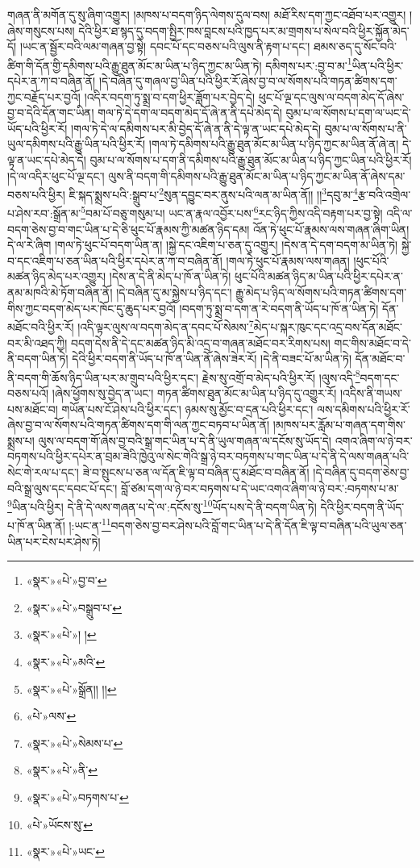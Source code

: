 གཞན་ནི་མགོན་དུ་སུ་ཞིག་འགྱུར། །མཁས་པ་བདག་ཉིད་ལེགས་དུལ་བས། མཐོ་རིས་དག་ཀྱང་འཐོབ་པར་འགྱུར། །ཞེས་གསུངས་པས། དེའི་ཕྱིར་ཐ་སྙད་དུ་བདག་སྤྱིར་ཁས་བླངས་པའི་ཁྱད་པར་མ་གྲགས་པ་སེལ་བའི་ཕྱིར་སྐྱོན་མེད་དོ། །ཡང་ན་སྦྱོར་བའི་ལམ་གཞན་བྱ་སྟེ། དབང་པོ་དང་བཅས་པའི་ལུས་ནི་རྟག་པ་དང་། ཐམས་ཅད་དུ་སོང་བའི་ཚིག་གི་དོན་གྱི་དམིགས་པའི་རྒྱུ་ཐུན་མོང་མ་ཡིན་པ་ཉིད་ཀྱང་མ་ཡིན་ཏེ། དམིགས་པར་:བྱ་བ་མ་\footnote{«སྣར་»«པེ་»བྱ་བ་}ཡིན་པའི་ཕྱིར་དཔེར་ན་ཀ་བ་བཞིན་ནོ། །དེ་བཞིན་དུ་གཞལ་བྱ་ཡིན་པའི་ཕྱིར་རོ་ཞེས་བྱ་བ་ལ་སོགས་པའི་གཏན་ཚིགས་དག་ཀྱང་བརྗོད་པར་བྱའོ། །འདིར་བདག་ཏུ་སྨྲ་བ་དག་ཕྱིར་ཟློག་པར་བྱེད་དེ། ཕུང་པོ་ལྔ་དང་ལུས་ལ་བདག་མེད་དོ་ཞེས་བྱ་བ་དེའི་དོན་གང་ཡིན། གལ་ཏེ་དེ་དག་ལ་བདག་མེད་དོ་ཞེ་ན་ནི་དཔེ་མེད་དེ། བུམ་པ་ལ་སོགས་པ་དག་ལ་ཡང་དེ་ཡོད་པའི་ཕྱིར་རོ། །གལ་ཏེ་དེ་ལ་དམིགས་པར་མི་བྱེད་དོ་ཞེ་ན་ནི་དེ་ལྟ་ན་ཡང་དཔེ་མེད་དེ། བུམ་པ་ལ་སོགས་པ་ནི་ཡུལ་དམིགས་པའི་རྒྱུ་ཡིན་པའི་ཕྱིར་རོ། །གལ་ཏེ་དམིགས་པའི་རྒྱུ་ཐུན་མོང་མ་ཡིན་པ་ཉིད་ཀྱང་མ་ཡིན་ནོ་ཞེ་ན། དེ་ལྟ་ན་ཡང་དཔེ་མེད་དེ། བུམ་པ་ལ་སོགས་པ་དག་ནི་དམིགས་པའི་རྒྱུ་ཐུན་མོང་མ་ཡིན་པ་ཉིད་ཀྱང་ཡིན་པའི་ཕྱིར་རོ། །དེ་ལ་འདིར་ཕུང་པོ་ལྔ་དང་། ལུས་ནི་བདག་གི་དམིགས་པའི་རྒྱུ་ཐུན་མོང་མ་ཡིན་པ་ཉིད་ཀྱང་མ་ཡིན་ནོ་ཞེས་དམ་བཅས་པའི་ཕྱིར། ཇི་སྐད་སྨྲས་པའི་:སྒྲུབ་པ་\footnote{«སྣར་»«པེ་»བསྒྲུབ་པ་}སུན་དབྱུང་བར་ནུས་པའི་ལན་མ་ཡིན་ནོ།། །།\footnote{«སྣར་»«པེ་»། །}དབུ་མ་\footnote{«སྣར་»«པེ་»མའི་}རྩ་བའི་འགྲེལ་པ་ཤེས་རབ་:སྒྲོན་མ་\footnote{«སྣར་»«པེ་»སྒྲོན།། །།}བམ་པོ་བཅུ་གསུམ་པ། ཡང་ན་རྣལ་འབྱོར་པས་\footnote{«པེ་»ལས་}རང་ཉིད་ཀྱིས་འདི་བརྟག་པར་བྱ་སྟེ། འདི་ལ་བདག་ཅེས་བྱ་བ་གང་ཡིན་པ་དེ་ཅི་ཕུང་པོ་རྣམས་ཀྱི་མཚན་ཉིད་དམ། འོན་ཏེ་ཕུང་པོ་རྣམས་ལས་གཞན་ཞིག་ཡིན། དེ་ལ་རེ་ཞིག །གལ་ཏེ་ཕུང་པོ་བདག་ཡིན་ན། །སྐྱེ་དང་འཇིག་པ་ཅན་དུ་འགྱུར། །དེས་ན་དེ་དག་བདག་མ་ཡིན་ཏེ། སྐྱེ་བ་དང་འཇིག་པ་ཅན་ཡིན་པའི་ཕྱིར་དཔེར་ན་ཀ་བ་བཞིན་ནོ། །གལ་ཏེ་ཕུང་པོ་རྣམས་ལས་གཞན། །ཕུང་པོའི་མཚན་ཉིད་མེད་པར་འགྱུར། །དེས་ན་དེ་ནི་མེད་པ་ཁོ་ན་ཡིན་ཏེ། ཕུང་པོའི་མཚན་ཉིད་མ་ཡིན་པའི་ཕྱིར་དཔེར་ན་ནམ་མཁའི་མེ་ཏོག་བཞིན་ནོ། །དེ་བཞིན་དུ་མ་སྐྱེས་པ་ཉིད་དང་། རྒྱུ་མེད་པ་ཉིད་ལ་སོགས་པའི་གཏན་ཚིགས་དག་གིས་ཀྱང་བདག་མེད་པར་ཁོང་དུ་ཆུད་པར་བྱའོ། །བདག་ཏུ་སྨྲ་བ་དག་ན་རེ་བདག་ནི་ཡོད་པ་ཁོ་ན་ཡིན་ཏེ། དོན་མཐོང་བའི་ཕྱིར་རོ། །འདི་ལྟར་ལུས་ལ་བདག་མེད་ན་དབང་པོ་སེམས་\footnote{«སྣར་»«པེ་»སེམས་པ་}མེད་པ་སྐར་ཁུང་དང་འདྲ་བས་དོན་མཐོང་བར་མི་འཐད་ཀྱི། བདག་དེས་ནི་དེ་དང་མཚན་ཉིད་མི་འདྲ་བ་གཞན་མཐོང་བར་རིགས་པས། གང་གིས་མཐོང་བ་དེ་ནི་བདག་ཡིན་ཏེ། དེའི་ཕྱིར་བདག་ནི་ཡོད་པ་ཁོ་ན་ཡིན་ནོ་ཞེས་ཟེར་རོ། །དེ་ནི་བཟང་པོ་མ་ཡིན་ཏེ། དོན་མཐོང་བ་ནི་བདག་གི་ཆོས་ཉིད་ཡིན་པར་མ་གྲུབ་པའི་ཕྱིར་དང་། རྗེས་སུ་འགྲོ་བ་མེད་པའི་ཕྱིར་རོ། །ལུས་འདི་\footnote{«སྣར་»«པེ་»ནི་}བདག་དང་བཅས་པའོ། །ཞེས་ཕྱོགས་སུ་བྱེད་ན་ཡང་། གཏན་ཚིགས་ཐུན་མོང་མ་ཡིན་པ་ཉིད་དུ་འགྱུར་རོ། །འདིས་ནི་གཡས་པས་མཐོང་བ། གཡོན་པས་ངོ་ཤེས་པའི་ཕྱིར་དང་། ཉམས་སུ་མྱོང་བ་དྲན་པའི་ཕྱིར་དང་། ལས་དམིགས་པའི་ཕྱིར་རོ་ཞེས་བྱ་བ་ལ་སོགས་པའི་གཏན་ཚིགས་དག་གི་ལན་ཀྱང་བཏབ་པ་ཡིན་ནོ། །མཁས་པར་རློམ་པ་གཞན་དག་གིས་སྨྲས་པ། ལུས་ལ་བདག་གོ་ཞེས་བྱ་བའི་སྒྲ་གང་ཡིན་པ་དེ་ནི་ཡུལ་གཞན་ལ་དངོས་སུ་ཡོད་དེ། འགའ་ཞིག་ལ་ཉེ་བར་བཏགས་པའི་ཕྱིར་དཔེར་ན་བྲམ་ཟེའི་ཁྱེའུ་ལ་སེང་གེའི་སྒྲ་ཉེ་བར་བཏགས་པ་གང་ཡིན་པ་དེ་ནི་དེ་ལས་གཞན་པའི་སེང་གེ་རལ་པ་དང་། ཟེ་བ་སྤུངས་པ་ཅན་ལ་དོན་ཇི་ལྟ་བ་བཞིན་དུ་མཐོང་བ་བཞིན་ནོ། །དེ་བཞིན་དུ་བདག་ཅེས་བྱ་བའི་སྒྲ་ལུས་དང་དབང་པོ་དང་། བློ་ཙམ་དག་ལ་ཉེ་བར་བཏགས་པ་དེ་ཡང་འགའ་ཞིག་ལ་ཉེ་བར་:བཏགས་པ་མ་\footnote{«སྣར་»«པེ་»བཏགས་པ་}ཡིན་པའི་ཕྱིར། དེ་ནི་དེ་ལས་གཞན་པ་དེ་ལ་:དངོས་སུ་\footnote{«པེ་»ཡོངས་སུ་}ཡོད་པས་དེ་ནི་བདག་ཡིན་ཏེ། དེའི་ཕྱིར་བདག་ནི་ཡོད་པ་ཁོ་ན་ཡིན་ནོ། །:ཡང་ན་\footnote{«སྣར་»«པེ་»ཡང་}བདག་ཅེས་བྱ་བར་ཤེས་པའི་བློ་གང་ཡིན་པ་དེ་ནི་དོན་ཇི་ལྟ་བ་བཞིན་པའི་ཡུལ་ཅན་ཡིན་པར་ངེས་པར་ཤེས་ཏེ། 
